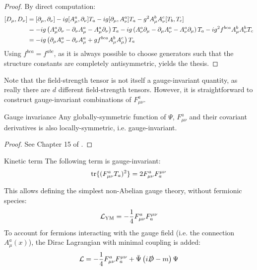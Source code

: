 \begin{proofbox}
  \begin{proof}
    By direct computation:
    \begin{equation*}
      \begin{split}
        [D_\mu , D_\nu]
        & = [\partial_\mu , \partial_\nu] - i g [A_\mu^a , \partial_\nu] T_a - i g [\partial_\mu , A_\nu^a] T_a - g^2 A_\mu^b A_\nu^c [T_b , T_c] \\
        & = - i g \left( A_\mu^a \partial_\nu - \partial_\nu A_\mu^a - A_\mu^a \partial_\nu \right) T_a - i g \left( A_\nu^a \partial_\mu - \partial_\mu A_\nu^a - A_\nu^a \partial_\mu \right) T_a - i g^2 f^{bca} A_\mu^b A_\nu^b T_c \\
        & = - i g \left( \partial_\mu A_\nu^a - \partial_\nu A_\mu^a + g f^{bca} A_\mu^b A_\mu^c \right) T_a
      \end{split}
    \end{equation*}
    Using $ f^{bca} = f^{abc} $, as it is always possible to choose generators such that the structure constants are completely antisymmetric, yields the thesis.
  \end{proof}
\end{proofbox}

Note that the field-strength tensor is not itself a gauge-invariant quantity, as really there are $ d $ different field-strength tensors. However, it is straightforward to construct gauge-invariant combinations of $ F_{\mu \nu}^a $.

\begin{theorem}{Gauge invariance}{}
  Any globally-symmetric function of $ \Psi $, $ F_{\mu \nu}^a $ and their covariant derivatives is also locally-symmetric, i.e. gauge-invariant.
\end{theorem}

\begin{proofbox}
  \begin{proof}
    See Chapter 15 of \cite{Peskin-1995}.
  \end{proof}
\end{proofbox}

\begin{lemma}{Kinetic term}{}
  The following term is gauge-invariant:
  \begin{equation}
    \operatorname{tr} \{(F_{\mu \nu}^a T_a)^2\} = 2 F_{\mu \nu}^a F^{\mu \nu}_a
  \end{equation}
\end{lemma}

This allows defining the simplest non-Abelian gauge theory,  without fermionic species:
\begin{equation}
  \mathcal{L}_\text{YM} = - \frac{1}{4} F_{\mu \nu}^a F^{\mu \nu}_a
\end{equation}
To account for fermions interacting with the gauge field (i.e. the connection $ A_\mu^a(x) $), the Dirac Lagrangian with minimal coupling is added:
\begin{equation}
  \mathcal{L} = - \frac{1}{4} F_{\mu \nu}^a F^{\mu \nu}_a + \bar{\Psi} \left( i \slashed{D} - m \right) \Psi
\end{equation}


